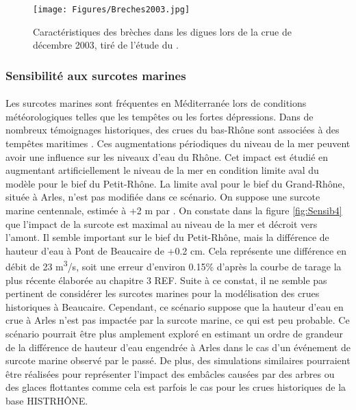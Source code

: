 \documentclass[11pt]{article}
\begin{document}
	\begin{figure}[h]
		\centering
		\texttt{[image: Figures/Breches2003.jpg]}
        \caption{Caractéristiques des brèches dans les digues lors de la crue de décembre 2003, tiré de l'étude du \citet{symadrem_programme_2012}.}
		\label{fig:Breches2003}
	\end{figure}		
	
	\subsubsection{Sensibilité aux surcotes marines}	
	
	\paragraph{} Les surcotes marines sont fréquentes en Méditerranée lors de conditions météorologiques telles que les tempêtes ou les fortes dépressions. Dans de nombreux témoignages historiques, des crues du bas-Rhône sont associées à des tempêtes maritimes \citet{pichard_sept_2014}. Ces augmentations périodiques du niveau de la mer peuvent avoir une influence sur les niveaux d'eau du Rhône. Cet impact est étudié en augmentant artificiellement le niveau de la mer en condition limite aval du modèle pour le bief du Petit-Rhône. La limite aval pour le bief du Grand-Rhône, située à Arles, n'est pas modifiée dans ce scénario. On suppose une surcote marine centennale, estimée à +2 m par \citet{kergadallan_estimation_2015}. On constate dans la figure \ref{fig:Sensib4} que l'impact de la surcote est maximal au niveau de la mer et décroit vers l'amont. Il semble important sur le bief du Petit-Rhône, mais la différence de hauteur d'eau à Pont de Beaucaire de +0.2 cm. Cela représente une différence en débit de 23 m\textsuperscript{3}/s, soit une erreur d'environ 0.15\% d'après la courbe de tarage la plus récente élaborée au chapitre 3 REF. Suite à ce constat, il ne semble pas pertinent de considérer les surcotes marines pour la modélisation des crues historiques à Beaucaire. Cependant, ce scénario suppose que la hauteur d'eau en crue à Arles n'est pas impactée par la surcote marine, ce qui est peu probable. Ce scénario pourrait être plus amplement exploré en estimant un ordre de grandeur de la différence de hauteur d'eau engendrée à Arles dans le cas d'un événement de surcote marine observé par le passé. De plus, des simulations similaires pourraient être réalisées pour représenter l'impact des embâcles causées par des arbres ou des glaces flottantes comme cela est parfois le cas pour les crues historiques de la base HISTRHÔNE.
	\FloatBarrier
\end{document}
